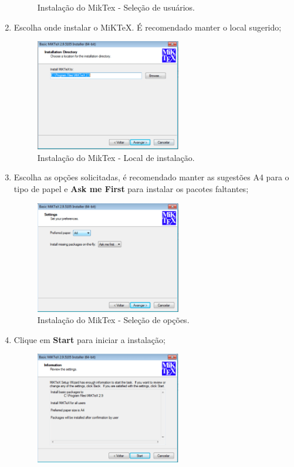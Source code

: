 \begin{enumerate}
\begin{figure}[H]
  \caption{Instalação do MikTex - Seleção de usuários.}
\end{figure}
\item Escolha onde instalar o MiKTeX. É recomendado manter o local sugerido;
\begin{figure}[H]
  \centering
  \includegraphics[width=0.6\textwidth]{./fig/miktex04}
  \caption{Instalação do MikTex - Local de instalação.}
\end{figure}
\item Escolha as opções solicitadas, é recomendado manter as sugestões A4 para o tipo de papel e \textbf{Ask me First} para instalar os pacotes faltantes;
\begin{figure}[H]
  \centering
  \includegraphics[width=0.6\textwidth]{./fig/miktex05}
  \caption{Instalação do MikTex - Seleção de opções.}
\end{figure}
\item Clique em \textbf{Start} para iniciar a instalação;
\begin{figure}[H]
  \centering
  \includegraphics[width=0.6\textwidth]{./fig/miktex06}

\end{figure}
\end{enumerate}
